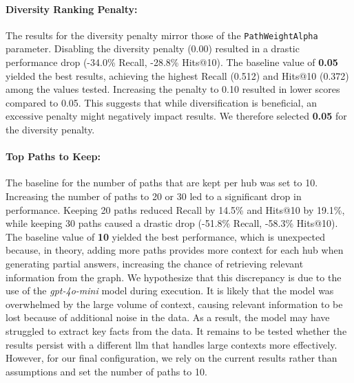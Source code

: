 \begin{sloppypar}
\paragraph{Diversity Ranking Penalty:} 
The results for the diversity penalty mirror those of the \texttt{PathWeightAlpha} parameter. Disabling the diversity penalty (0.00) resulted in a drastic performance drop (-34.0\% Recall, -28.8\% Hits@10). The baseline value of \textbf{0.05} yielded the best results, achieving the highest Recall (0.512) and Hits@10 (0.372) among the values tested. Increasing the penalty to 0.10 resulted in lower scores compared to 0.05. This suggests that while diversification is beneficial, an excessive penalty might negatively impact results. We therefore selected \textbf{0.05} for the diversity penalty.
\end{sloppypar}

\paragraph{Top Paths to Keep:} 
The baseline for the number of paths that are kept per hub was set to 10. Increasing the number of paths to 20 or 30 led to a significant drop in performance. Keeping 20 paths reduced Recall by 14.5\% and Hits@10 by 19.1\%, while keeping 30 paths caused a drastic drop (-51.8\% Recall, -58.3\% Hits@10). The baseline value of \textbf{10} yielded the best performance, which is unexpected because, in theory, adding more paths provides more context for each hub when generating partial answers, increasing the chance of retrieving relevant information from the graph. We hypothesize that this discrepancy is due to the use of the \emph{gpt-4o-mini} model during execution. It is likely that the model was overwhelmed by the large volume of context, causing relevant information to be lost because of additional noise in the data. As a result, the model may have struggled to extract key facts from the data. It remains to be tested whether the results persist with a different \gls{llm} that handles large contexts more effectively. However, for our final configuration, we rely on the current results rather than assumptions and set the number of paths to 10.

